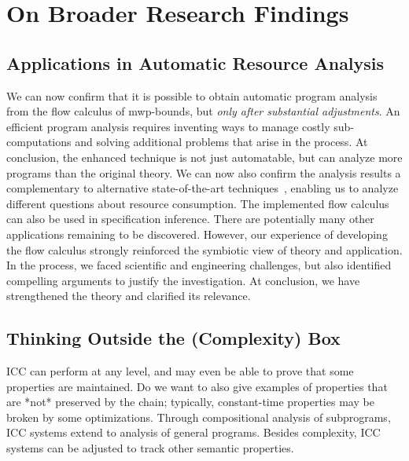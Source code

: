 \section{On Broader Research Findings}
\label{sec:broader-findings}

\subsection{Applications in Automatic Resource Analysis}
\label{subsec:res-resource-analysis}

We can now confirm that it is possible to obtain automatic program analysis from the flow calculus of mwp-bounds, but \emph{only after substantial adjustments}.
An efficient program analysis requires inventing ways to manage costly sub-computations and solving additional problems that arise in the process.
At conclusion, the enhanced technique is not just automatable, but can analyze more programs than the original theory.
We can now also confirm the analysis results a complementary to alternative state-of-the-art techniques~\cite[p. 5]{aubert2023b}, enabling us to analyze different questions about resource consumption.
The implemented flow calculus can also be used in specification inference.
There are potentially many other applications remaining to be discovered.
However, our experience of developing the flow calculus strongly reinforced the symbiotic view of theory and application.
In the process, we faced scientific and engineering challenges, but also identified compelling arguments to justify the investigation.
At conclusion, we have strengthened the theory and clarified its relevance.

\subsection{Thinking Outside the (Complexity) Box}
\label{subsec:res-other-props}

ICC can perform at any level, and may even be able to prove that some properties are maintained.
Do we want to also give examples of properties that are *not* preserved by the chain;
typically, constant-time properties may be broken by some optimizations.
Through compositional analysis of subprograms, ICC systems extend to analysis of general programs.
Besides complexity, ICC systems can be adjusted to track other semantic properties.

